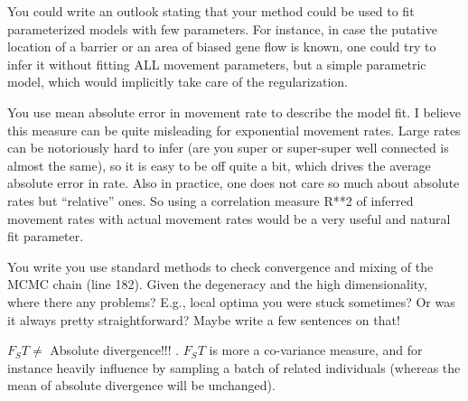 
\begin{point}{}
    You could write an outlook stating that your method could be used to fit
    parameterized models with few parameters. For instance, in case the putative
    location of a barrier or an area of biased gene flow is known, one could try to
    infer it without fitting ALL movement parameters, but a simple parametric
    model, which would implicitly take care of the regularization.  
\end{point}


\begin{point}{}
    You use mean absolute error in movement rate to describe the model fit. I
    believe this measure can be quite misleading for exponential movement rates.
    Large rates can be notoriously hard to infer (are you super or super-super well
    connected is almost the same), so it is easy to be off quite a bit, which
    drives the average absolute error in rate. Also in practice, one does not care
    so much about absolute rates but ``relative'' ones. So using a correlation
    measure R**2  of inferred movement rates with actual movement rates would be a
    very useful and natural fit parameter.  
\end{point}

\reply{
}

\begin{point}{}
    You write you use standard methods to check convergence and mixing of the
    MCMC chain (line 182). Given the degeneracy and the high dimensionality,
    where there any problems? E.g., local optima you were stuck sometimes? Or
    was it always pretty straightforward? Maybe write a few sentences on that!
\end{point}


\begin{point}{\revref}
    $F_ST \neq$ Absolute divergence!!! . $F_ST$ is more a
    co-variance measure, and for instance heavily influence by sampling a batch
    of related individuals (whereas the mean of absolute divergence will be
    unchanged).
\end{point}

